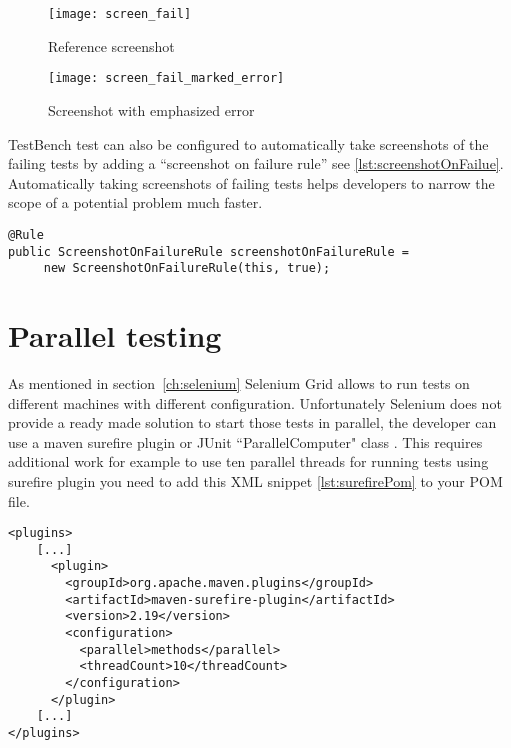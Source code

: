 	\begin{figure}
	\centering
	\texttt{[image: screen\_fail]}
	\caption{Reference screenshot}
	\label{fig:failedscreen}
	\end{figure}

	\begin{figure}
	\centering
	\texttt{[image: screen\_fail\_marked\_error]}
	\caption{Screenshot with emphasized error}
	\label{fig:failedscreenmarked}
	\end{figure}

TestBench test can also be configured to automatically take screenshots of the failing tests by adding
a ``screenshot on failure rule'' see \ref{lst:screenshotOnFailue}. Automatically
taking screenshots of failing tests helps developers to narrow the
scope of a potential problem much faster.

\lstset{style=a1listing}
  	\begin{lstlisting}[caption=Adding screenshot on failure	rule,label={lst:screenshotOnFailue}]
@Rule
public ScreenshotOnFailureRule screenshotOnFailureRule =
	 new ScreenshotOnFailureRule(this, true);
	\end{lstlisting}

\section{Parallel testing}
\label{paralelTesting}
As mentioned in section~\ref{ch:selenium} Selenium Grid allows to run
tests on different machines with different configuration. Unfortunately
Selenium does not provide a ready made solution to start those tests in
parallel, the developer can  use a maven surefire plugin \cite{sureFireExample} 
or JUnit ``ParallelComputer" class \cite{junitParallelComputer}. This requires
additional work for example to use ten parallel threads for running tests using
surefire plugin you need to add this XML snippet \ref{lst:surefirePom}
to your POM file.

\lstset{style=console}
\begin{lstlisting}[caption=Get Vaadin Table cell Value,label={lst:surefirePom}]
<plugins>
    [...]
      <plugin>
        <groupId>org.apache.maven.plugins</groupId>
        <artifactId>maven-surefire-plugin</artifactId>
        <version>2.19</version>
        <configuration>
          <parallel>methods</parallel>
          <threadCount>10</threadCount>
        </configuration>
      </plugin>
    [...]
</plugins>
\end{lstlisting}	

